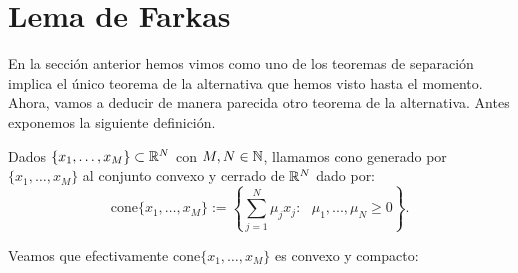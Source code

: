 \chapter{Lema de Farkas}

En la sección anterior hemos vimos como uno de los teoremas de separación implica el único teorema de la alternativa que hemos visto hasta el momento. Ahora, vamos a deducir de manera parecida otro teorema de la alternativa. Antes exponemos la siguiente definición.

\begin{definicion}
	Dados $ \{x_1,\dots, x_M \} \subset \mathbb{R}^N  $ con $ M, N \in \mathbb{N} $, llamamos cono generado por $ \{x_1,\dots, x_M \} $ al conjunto convexo y cerrado de $ \mathbb{R}^N $ dado por:
	\begin{equation*}
	\mathrm{cone}\{x_1,\dots, x_M \} := \left\lbrace \sum_{j=1}^{N}{\mu_j x_j } : \text{ } \mu_1,...,\mu_N \geq 0 \right\rbrace .
	\end{equation*}
\end{definicion}

Veamos que efectivamente $ \mathrm{cone}\{x_1,\dots, x_M \} $ es convexo y compacto:

